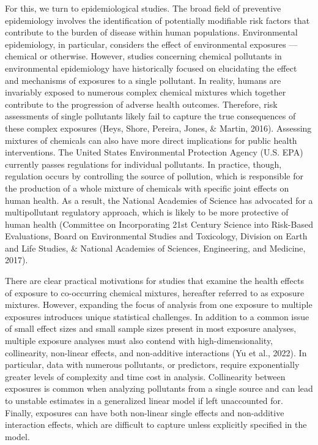 \documentclass[12pt, twoside]{amherstthesis}
\begin{document}
For this, we turn to epidemiological studies. The broad field of preventive epidemiology involves the identification of potentially modifiable risk factors that contribute to the burden of disease within human populations. Environmental epidemiology, in particular, considers the effect of environmental exposures --- chemical or otherwise. However, studies concerning chemical pollutants in environmental epidemiology have historically focused on elucidating the effect and mechanisms of exposures to a single pollutant. In reality, humans are invariably exposed to numerous complex chemical mixtures which together contribute to the progression of adverse health outcomes. Therefore, risk assessments of single pollutants likely fail to capture the true consequences of these complex exposures (Heys, Shore, Pereira, Jones, \& Martin, 2016). Assessing mixtures of chemicals can also have more direct implications for public health interventions. The United States Environmental Protection Agency (U.S. EPA) currently passes regulations for individual pollutants. In practice, though, regulation occurs by controlling the source of pollution, which is responsible for the production of a whole mixture of chemicals with specific joint effects on human health. As a result, the National Academies of Science has advocated for a multipollutant regulatory approach, which is likely to be more protective of human health (Committee on Incorporating 21st Century Science into Risk-Based Evaluations, Board on Environmental Studies and Toxicology, Division on Earth and Life Studies, \& National Academies of Sciences, Engineering, and Medicine, 2017).

There are clear practical motivations for studies that examine the health effects of exposure to co-occurring chemical mixtures, hereafter referred to as exposure mixtures. However, expanding the focus of analysis from one exposure to multiple exposures introduces unique statistical challenges. In addition to a common issue of small effect sizes and small sample sizes present in most exposure analyses, multiple exposure analyses must also contend with high-dimensionality, collinearity, non-linear effects, and non-additive interactions (Yu et al., 2022). In particular, data with numerous pollutants, or predictors, require exponentially greater levels of complexity and time cost in analysis. Collinearity between exposures is common when analyzing pollutants from a single source and can lead to unstable estimates in a generalized linear model if left unaccounted for. Finally, exposures can have both non-linear single effects and non-additive interaction effects, which are difficult to capture unless explicitly specified in the model.
\end{document}
